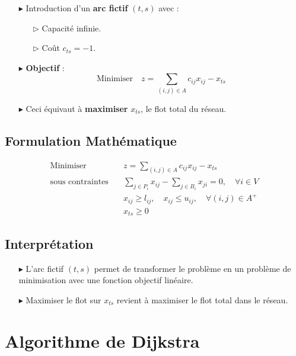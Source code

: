 \documentclass{report}
\begin{document}
\begin{multicols*}{2}
        \begin{itemize}
            \item[$\blacktriangleright$] Introduction d'un \textbf{arc fictif} \( (t, s) \) avec :
                \begin{itemize}
                    \item[$\rhd$] Capacité infinie.
                    \item[$\rhd$] Coût \( c_{ts} = -1 \).
                \end{itemize}
            \item[$\blacktriangleright$] \textbf{Objectif} :
            \[%
                \text{Minimiser} \quad z = \sum_{(i,j) \in A} c_{ij} x_{ij} - x_{ts}
            \]%
            \item[$\blacktriangleright$] Ceci équivaut à \textbf{maximiser} \( x_{ts} \), le flot total du réseau.
        \end{itemize}

    \subsection*{Formulation Mathématique}

\begin{align*}
\text{Minimiser} \quad & z = \sum_{(i,j) \in A} c_{ij} x_{ij} - x_{ts} \\
\text{sous contraintes} \quad & \sum_{j \in P_i} x_{ij} - \sum_{j \in B_i} x_{ji} = 0, \quad \forall i \in V \\
& x_{ij} \geq l_{ij}, \quad x_{ij} \leq u_{ij}, \quad \forall (i,j) \in A^+ \\
& x_{ts} \geq 0
\end{align*}

\subsection*{Interprétation}

\begin{itemize}
    \item[$\blacktriangleright$] L'arc fictif \( (t, s) \) permet de transformer le problème en un problème de minimisation avec une fonction objectif linéaire.
    \item[$\blacktriangleright$] Maximiser le flot sur \( x_{ts} \) revient à maximiser le flot total dans le réseau.
\end{itemize}
\section*{Algorithme de Dijkstra}


\end{multicols*}
\end{document}
